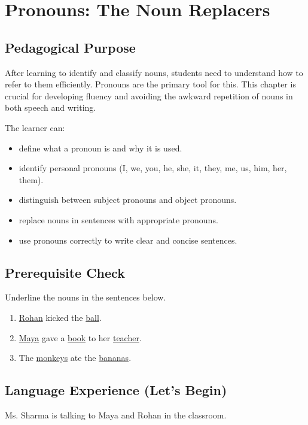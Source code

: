 
\chapter{Pronouns: The Noun Replacers}

\section{Pedagogical Purpose}
After learning to identify and classify nouns, students need to understand how to refer to them efficiently. Pronouns are the primary tool for this. This chapter is crucial for developing fluency and avoiding the awkward repetition of nouns in both speech and writing.

\begin{learningobjectives}
The learner can:
\begin{itemize}
    \item define what a pronoun is and why it is used.
    \item identify personal pronouns (I, we, you, he, she, it, they, me, us, him, her, them).
    \item distinguish between subject pronouns and object pronouns.
    \item replace nouns in sentences with appropriate pronouns.
    \item use pronouns correctly to write clear and concise sentences.
\end{itemize}
\end{learningobjectives}

\section{Prerequisite Check}
\begin{quickcheck}
Underline the nouns in the sentences below.
\begin{enumerate}
    \item \underline{Rohan} kicked the \underline{ball}.
    \item \underline{Maya} gave a \underline{book} to her \underline{teacher}.
    \item The \underline{monkeys} ate the \underline{bananas}.
\end{enumerate}
\end{quickcheck}

\section{Language Experience (Let's Begin)}
Ms. Sharma is talking to Maya and Rohan in the classroom.

